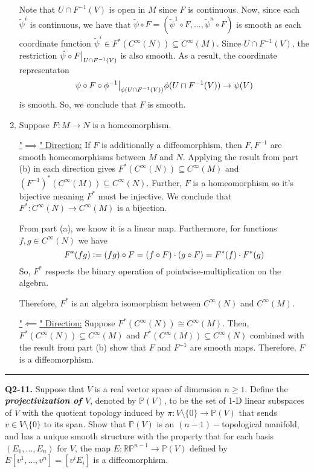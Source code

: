 \documentclass{article}
\newcommand{\defeq}{\vcentcolon=}
\newcommand{\restr}[2]{{%
  \left.\kern-\nulldelimiterspace %
  #1 %
  \vphantom{\big|} %
  \right|_{#2} %
  }}
\begin{document}
\begin{enumerate}[label=(\alph*)]
  Note that $U \cap F^{-1}(V)$ is open in $M$ since $F$ is continuous. Now, since each $\tilde{\psi}^{i}$ is continuous, we have that $\tilde{\psi} \circ F = (\tilde{\psi}^{1} \circ F, \dots,\tilde{\psi}^{n} \circ F)$ is smooth as each coordinate function $\tilde{\psi}^{i} \in F^*(C^{\infty}(N)) \subseteq C^{\infty}(M)$. Since  $U \cap F^{-1}(V)$, the restriction $\restr{\tilde{\psi} \circ F}{U \cap F^{-1}(V)}$ is also smooth. As a result, the coordinate representaton 
  \[ \restr{\psi \circ F \circ \phi^{-1}}{\phi(U \cap F^{-1}(V))} \phi(U \cap F^{-1}(V)) \rightarrow \psi(V) \]
  is smooth. So, we conclude that $F$ is smooth.

  \vskip 0.5cm
  \item Suppose $F : M \rightarrow N$ is a homeomorphism.
  
  \vskip 0.25cm
  \underline{"$\implies$" Direction:} If $F$ is additionally a diffeomorphism, then $F, F^{-1}$ are smooth homeomorphisms between $M$ and $N$. Applying the result from part (b) in each direction gives  $F^*(C^{\infty}(N)) \subseteq C^{\infty}(M)$ and $(F^{-1})^*(C^{\infty}(M)) \subseteq C^{\infty}(N)$. Further, $F$ is a homeomorphism so it's bijective meaning $F^{*}$ must be injective. We conclude that $F^* : C^{\infty}(N) \rightarrow C^{\infty}(M)$ is a bijection. 

  From part (a), we know it is a linear map. Furthermore, for functions $f, g \in C^{\infty}(N)$ we have 
  \[ F^*(fg) \defeq (fg) \circ F = \left( f \circ F \right) \cdot \left( g \circ F \right) = F^*(f) \cdot F^*(g) \]
  So, $F^*$ respects the binary operation of pointwise-multiplication on the algebra.

  Therefore, $F^*$ is an algebra isomorphism between $C^{\infty}(N)$ and $C^{\infty}(M)$.

  \vskip 0.25cm
  \underline{"$\impliedby$" Direction:} Suppose $F^{*}(C^{\infty}(N)) \cong C^{\infty}(M)$. Then, $F^{*}(C^{\infty}(N)) \subseteq C^{\infty}(M)$ and $F^{*}(C^{\infty}(M)) \subseteq C^{\infty}(N)$ combined with the result from part (b) show that $F$ and $F^{-1}$ are smooth maps. Therefore, $F$ is a diffeomorphism.
\end{enumerate}

\vskip 0.5cm
\hrule 
\vskip 0.5cm


\textbf{Q2-11.} Suppose that $V$ is a real vector space of dimension $n \geq 1$. Define the \emph{\textbf{projectivization of $V$}}, denoted by $\mathbb{P}(V)$, to be the set of 1-D linear subspaces of $V$ with the quotient topology induced by $\pi : V \setminus \{0\} \rightarrow \mathbb{P}(V)$ that sends $v \in V \setminus \{0\}$ to its span. Show that $\mathbb{P}(V)$ is an $(n-1)-$topological manifold, and has a unique smooth structure with the property that for each basis $(E_1, \dots, E_n)$ for $V$, the map $E : \mathbb{RP}^{n-1} \rightarrow \mathbb{P}(V)$ defined by $E \left[ v^1, \dots, v^n \right] = \left[ v^i E_i \right]$ is a diffeomorphism.
\end{document}
